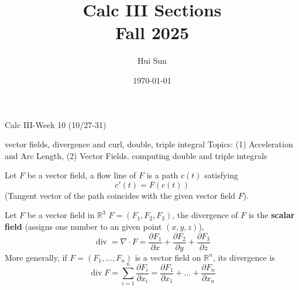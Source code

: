 \documentclass[openany]{book}
\title{Calc III Sections
\\ 
\vspace{0.4cm}
\large Fall 2025}
\date{\today}
\author{Hui Sun}
\newcommand{\R}{\mathbb{R}}
\newcommand{\diverg}{\operatorname{div}}
\begin{document}
\maketitle

\newpage


\begin{center}
    \Large Calc III-Week 10 (10/27-31)
\end{center}

\renewcommand\thesection{\arabic{section}}

\noindent


vector fields, divergence and curl, double, triple integral
Topics: (1) Acceleration and Arc Length, (2) Vector Fields.
computing double and triple integrals



\begin{defn}
    Let ${F}$ be a vector field, a flow line of $F$ is a path $c(t)$ satisfying 
    \begin{equation*}
        c'(t)=F(c(t))
    \end{equation*}
    (Tangent vector of the path coincides with the given vector field ${F}$).
\end{defn}

\begin{defn}[divergence]
    Let ${F}$ be a vector field in $\R^3$ $F=(F_1,F_2,F_3)$, the divergence of ${F}$ is the \textbf{scalar field} (assigns one number to an given point $(x, y, z)$), 
    \begin{equation*}
        \diverg =\nabla\cdot F=\frac{\partial F_1}{\partial x}+\frac{\partial F_2}{\partial y}+\frac{\partial F_3}{\partial z}
    \end{equation*}
    More generally, if $F=(F_1,\dots, F_n)$ is a vector field on $\R^n$, its divergence is 
    \begin{equation*}
        \diverg F=\sum_{i=1}^n\frac{\partial F_i}{\partial x_i}=\frac{\partial F_1}{\partial x_1}+\dots+\frac{\partial F_n}{\partial x_n}
    \end{equation*}
\end{defn}
\end{document}
